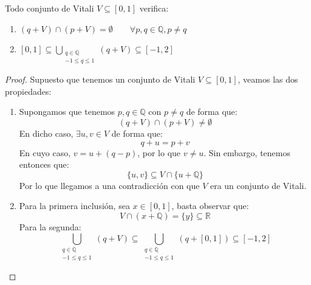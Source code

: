 \begin{prop}
    Todo conjunto de Vitali $V\subseteq [0,1]$ verifica:
    \begin{enumerate}
        \item $(q+V)\cap (p + V) = \emptyset \qquad \forall p,q\in \mathbb{Q}, p\neq q$
        \item $[0,1] \subseteq \bigcup\limits_{\substack{q\in \mathbb{Q}\\-1\leq q\leq 1}} (q+V) \subseteq [-1,2]$
    \end{enumerate}
    \begin{proof}
        Supuesto que tenemos un conjunto de Vitali $V\subseteq [0,1]$, veamos las dos propiedades:
        \begin{enumerate}
            \item Supongamos que tenemos $p,q\in \mathbb{Q}$ con $p\neq q$ de forma que:
                \begin{equation*}
                    (q+V)\cap (p+V)\neq \emptyset 
                \end{equation*}
                En dicho caso, $\exists u,v\in V$ de forma que:
                \begin{equation*}
                    q+u = p+v
                \end{equation*}
                En cuyo caso, $v = u + (q-p)$, por lo que $v\neq u$. Sin embargo, tenemos entonces que:
                \begin{equation*}
                    \{u,v\} \subseteq V \cap \{u+\mathbb{Q}\} 
                \end{equation*}
                Por lo que llegamos a una contradicción con que $V$ era un conjunto de Vitali.
            \item Para la primera inclusión, sea $x\in [0,1]$, basta observar que:
                \begin{equation*}
                    V\cap (x+\mathbb{Q}) = \{y\} \subseteq \mathbb{R}
                \end{equation*}
                Para la segunda:
                \begin{equation*}
                    \bigcup\limits_{\substack{q\in \mathbb{Q}\\-1\leq q\leq 1}} (q+V) \subseteq  \bigcup\limits_{\substack{q\in \mathbb{Q}\\-1\leq q\leq 1}} (q+[0,1]) \subseteq [-1,2] 
                \end{equation*}
        \end{enumerate}
    \end{proof}
\end{prop}

